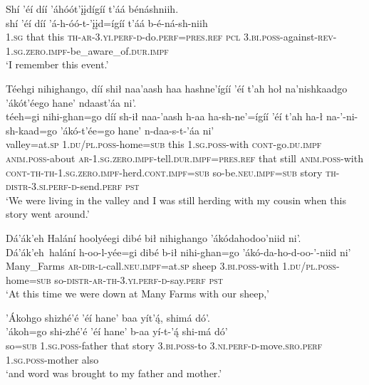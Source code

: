 \ea\label{ex:text6-11-18}
Shí ’éí díí ’áhóót’įįdígíí t’áá bénáshniih.\\
\gll shí	’éí	díí	’á-h-óó-t-’įįd=ígíí	t’áá	b-é-ná-sh-niih\\
     1.\textsc{sg}	that	this	\textsc{th}-\textsc{ar}-3.\textsc{yi}.\textsc{perf}-\textsc{d}-do.\textsc{perf}=\textsc{pres}.\textsc{ref}	\textsc{pcl}	3.\textsc{bi}.\textsc{poss}-against-\textsc{rev}-1.\textsc{sg}.\textsc{zero}.\textsc{impf}-be\_aware\_of.\textsc{dur}.\textsc{impf}\\
\glt `I remember this event.'
\z

\ea\label{ex:text6-11-19}
Téehgi nihighango, díí shił naa’aash haa hashne’ígíí ’éí t’ah hoł na’nishkaadgo ’ákót’éego hane’ ndaast’áa ni’.\\
\gll téeh=gi	nihi-ghan=go	díí	sh-ił	naa-’aash	h-aa	ha-sh-ne’=ígíí	’éí	t’ah	ha-ł	na-’-ni-sh-kaad=go	’ákó-t’ée=go	hane’	n-daa-s-t-’áa	ni’\\
     valley=at.\textsc{sp}	1.\textsc{du}/\textsc{pl}.\textsc{poss}-home=\textsc{sub}	this	1.\textsc{sg}.\textsc{poss}-with	\textsc{cont}-go.\textsc{du}.\textsc{impf}	\textsc{anim}.\textsc{poss}-about	\textsc{ar}-1.\textsc{sg}.\textsc{zero}.\textsc{impf}-tell.\textsc{dur}.\textsc{impf}=\textsc{pres}.\textsc{ref}	that	still	\textsc{anim}.\textsc{poss}-with	\textsc{cont}-\textsc{th}-\textsc{th}-1.\textsc{sg}.\textsc{zero}.\textsc{impf}-herd.\textsc{cont}.\textsc{impf}=\textsc{sub}	so-be.\textsc{neu}.\textsc{impf}=\textsc{sub}	story	\textsc{th}-\textsc{distr}-3.\textsc{si}.\textsc{perf}-\textsc{d}-send.\textsc{perf}	\textsc{pst}\\
\glt `We were living in the valley and I was still herding with my cousin when this story went around.'
\z

\ea\label{ex:text6-11-20}
Dá’ák’eh Halání hoolyéegi dibé bił nihighango ’ákódahodoo’niid ni’.\\
\gll Dá’ák’eh~{halání}	h-oo-l-yée=gi	dibé	b-ił	nihi-ghan=go	’ákó-da-ho-d-oo-’-niid	ni’\\
     Many\_Farms	\textsc{ar}-\textsc{dir}-\textsc{l}-call.\textsc{neu}.\textsc{impf}=at.\textsc{sp}	sheep	3.\textsc{bi}.\textsc{poss}-with	1.\textsc{du}/\textsc{pl}.\textsc{poss}-home=\textsc{sub}	so-\textsc{distr}-\textsc{ar}-\textsc{th}-3.\textsc{yi}.\textsc{perf}-\textsc{d}-say.\textsc{perf}	\textsc{pst}\\
\glt `At this time we were down at Many Farms with our sheep,'
\z

\newpage
\ea\label{ex:text6-11-21}
’Ákohgo shizhé’é ’éí hane’ baa yít’ą́, shimá dó’.\\
\gll ’ákoh=go	shi-zhé’é	’éí	hane’	b-aa	yí-t-’ą́	shi-má	dó’\\
     so=\textsc{sub}	1.\textsc{sg}.\textsc{poss}-father	that	story	3.\textsc{bi}.\textsc{poss}-to	3.\textsc{ni}.\textsc{perf}-\textsc{d}-move.\textsc{sro}.\textsc{perf}	1.\textsc{sg}.\textsc{poss}-mother	also\\
\glt `and word was brought to my father and mother.'
\z

